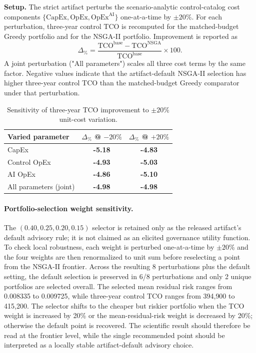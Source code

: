 \documentclass[preprint,12pt]{elsarticle}
\begin{document}
\noindent\textbf{Setup.} The strict artifact perturbs the scenario-analytic control-catalog cost components $\{\mathrm{CapEx}, \mathrm{OpEx}, \mathrm{OpEx}^{\mathrm{AI}}\}$ one-at-a-time by $\pm 20\%$. For each perturbation, three-year control TCO is recomputed for the matched-budget Greedy portfolio and for the NSGA-II portfolio. Improvement is reported as
\[
\Delta_{\%}=\frac{\mathrm{TCO}^{\mathrm{base}}-\mathrm{TCO}^{\mathrm{NSGA}}}{\mathrm{TCO}^{\mathrm{base}}}\times 100.
\]
A joint perturbation ("All parameters") scales all three cost terms by the same factor.
Negative values indicate that the artifact-default NSGA-II selection has higher three-year control TCO than the matched-budget Greedy comparator under that perturbation.

\begin{table}[H]
\caption{Sensitivity of three-year TCO improvement to \texorpdfstring{$\pm 20\%$}{+/-20\%} unit-cost variation.}
\label{tab:tco_sensitivity}
\centering
\small
\begin{tabular}{lcc}
\toprule
\textbf{Varied parameter} & $\Delta_{\%}$ @ $-20\%$ & $\Delta_{\%}$ @ $+20\%$ \\
\midrule
CapEx & \textbf{-5.18} & \textbf{-4.83} \\
Control OpEx & \textbf{-4.93} & \textbf{-5.03} \\
AI OpEx & \textbf{-4.86} & \textbf{-5.10} \\
\midrule
All parameters (joint) & \textbf{-4.98} & \textbf{-4.98} \\
\bottomrule
\end{tabular}
\end{table}

\paragraph{Portfolio-selection weight sensitivity.}
The $(0.40, 0.25, 0.20, 0.15)$ selector is retained only as the released artifact's default advisory rule; it is not claimed as an elicited governance utility function. To check local robustness, each weight is perturbed one-at-a-time by $\pm 20\%$ and the four weights are then renormalized to unit sum before reselecting a point from the NSGA-II frontier. Across the resulting 8 perturbations plus the default setting, the default selection is preserved in 6/8 perturbations and only 2 unique portfolios are selected overall. The selected mean residual risk ranges from 0.008335 to 0.009725, while three-year control TCO ranges from 394{,}900 to 415{,}200. The selector shifts to the cheaper but riskier portfolio when the TCO weight is increased by 20\% or the mean-residual-risk weight is decreased by 20\%; otherwise the default point is recovered. The scientific result should therefore be read at the frontier level, while the single recommended point should be interpreted as a locally stable artifact-default advisory choice.
\end{document}
